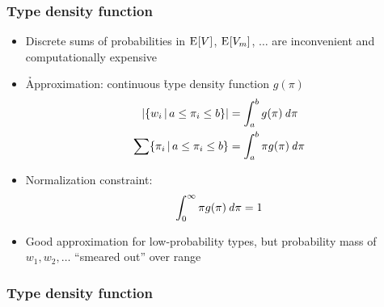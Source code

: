 \documentclass[t]{beamer} %
\begin{document}
\begin{frame}
  \frametitle{Type density function}

  \begin{itemize}
  \item Discrete sums of probabilities in $\mathrm{E}_{}[V]$, $\mathrm{E}_{}[V_m]$, $\ldots$ are inconvenient and computationally expensive
  \item \h{Approximation:} continuous \h{type density function} $g(\pi)$
    \begin{align*}
      \lvert \{w_i\,|\,a \leq \pi_i \leq b\}\rvert
      &= \int_a^b g(\pi) \,\mathit{d{\pi}}\\
      \sum \{\pi_i\,|\,a \leq \pi_i \leq b\}
      &= \int_a^b \pi g(\pi) \,\mathit{d{\pi}}
    \end{align*}
  \item<2-> Normalization constraint:
    \[
      \int_0^{\infty} \pi g(\pi) \,\mathit{d{\pi}} = 1
    \]
  \item<2-> Good approximation for low-probability types, but probability mass of $w_1, w_2, \ldots$ ``smeared out'' over range
  \end{itemize}
\end{frame}

\begin{frame}
  \frametitle{Type density function}

  \centering
\end{frame}
\end{document}
